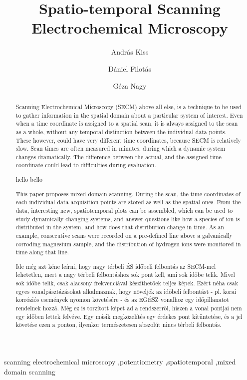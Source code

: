 \documentclass[3p]{elsarticle}
\begin{document}
\begin{frontmatter}

\title{Spatio-temporal Scanning Electrochemical Microscopy}
\author[akiss]{András Kiss}
\address[akiss, gnagy]{Department of General and Physical Chemistry, Faculty of Sciences, University of Pécs, 7624 Pécs, Ifjúság útja 6, Hungary}
\author[dfilotas]{Dániel Filotás}
\author[gnagy]{Géza Nagy}


\begin{abstract}

Scanning Electrochemical Microscopy (SECM) above all else, is a technique to be used to gather information in the spatial domain about a particular system of interest. Even when a time coordinate is assigned to a spatial scan, it is always assigned to the scan as a whole, without any temporal distinction between the individual data points. These however, could have very different time coordinates, because SECM is relatively slow. Scan times are often measured in minutes, during which a dynamic system changes dramatically. The difference between the actual, and the assigned time coordinate could lead to difficulties during evaluation.
 
 hello bello
 
This paper proposes mixed domain scanning. During the scan, the time coordinates of each individual data acquisition points are stored as well as the spatial ones. From the data, interesting new, spatiotemporal plots can be assembled, which can be used to study dynamically changing systems, and answer questions like how a species of ion is distributed in the system, and how does that distribution change in time. As an example, consecutive scans were recorded on a pre-defined line above a galvanically corroding magnesium sample, and the distribution of hydrogen ions were monitored in time along that line.

Ide még azt kéne leírni, hogy nagy térbeli ÉS időbeli felbontás az SECM-mel lehetetlen, mert a nagy térbeli felbontáshoz sok pont kell, ami sok időbe telik. Mivel sok időbe telik, csak alacsony frekvenciával készíthetőek teljes képek. Ezért néha csak egyes vonalpásztázásokat alkalmaznak, hogy növeljék az időbeli felbontást - pl. korai korróziós események nyomon követésére - és az EGÉSZ vonalhoz egy időpillanatot rendelnek hozzá. Még ez is torzított képet ad a rendszerről, hiszen a vonal pontjai nem egy időben lettek felvéve. Egy másik megközelítés egy érdekes pont kitüntetése, és a jel követése ezen a ponton, ilyenkor természetesen abszolút nincs térbeli felbontás.
\end{abstract}
\begin{keyword}
	scanning electrochemical microscopy \sep potentiometry \sep spatiotemporal \sep mixed domain scanning
\end{keyword}
\end{frontmatter}
\end{document}
